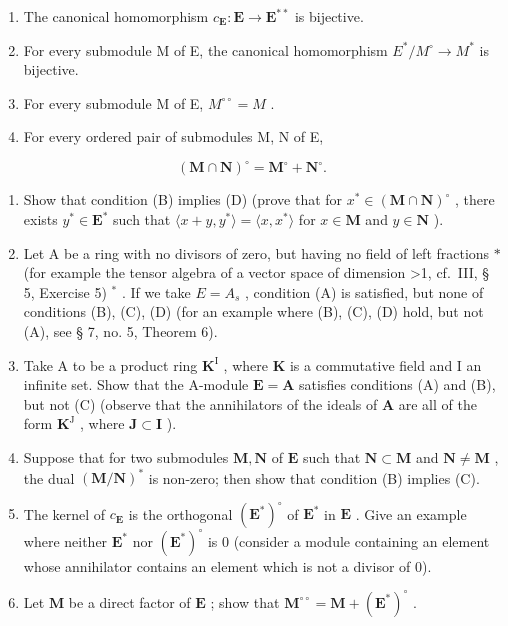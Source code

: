 \begin{enumerate}
\def\labelenumi{(\Alph{enumi})}
\item
  The canonical homomorphism \(c_{\mathbf{E}}: \mathbf{E} \to \mathbf{E}^{**}\) is bijective.
\item
  For every submodule M of E, the canonical homomorphism \(E^{*}/M^{\circ} \rightarrow M^{*}\) is bijective.
\item
  For every submodule M of E, \(M^{\circ\circ} = M\) .
\item
  For every ordered pair of submodules M, N of E,
\end{enumerate}

\[
(\mathbf {M} \cap \mathbf {N}) ^ {\circ} = \mathbf {M} ^ {\circ} + \mathbf {N} ^ {\circ}.
\]

\begin{enumerate}
\def\labelenumi{(\alph{enumi})}
\item
  Show that condition (B) implies (D) (prove that for \(x^{*} \in (\mathbf{M} \cap \mathbf{N})^{\circ}\) , there exists \(y^{*} \in \mathbf{E}^{*}\) such that \(\langle x + y, y^{*} \rangle = \langle x, x^{*} \rangle\) for \(x \in \mathbf{M}\) and \(y \in \mathbf{N}\) ).
\item
  Let A be a ring with no divisors of zero, but having no field of left fractions \(*\) (for example the tensor algebra of a vector space of dimension \textgreater1, cf.~III, § 5, Exercise 5) \(^{*}\) . If we take \(E = A_{s}\) , condition (A) is satisfied, but none of conditions (B), (C), (D) (for an example where (B), (C), (D) hold, but not (A), see § 7, no. 5, Theorem 6).
\item
  Take A to be a product ring \(\mathbf{K}^{\mathrm{I}}\) , where \(\mathbf{K}\) is a commutative field and I an infinite set. Show that the A-module \(\mathbf{E} = \mathbf{A}\) satisfies conditions (A) and (B), but not (C) (observe that the annihilators of the ideals of \(\mathbf{A}\) are all of the form \(\mathbf{K}^{\mathrm{J}}\) , where \(\mathbf{J} \subset \mathbf{I}\) ).
\item
  Suppose that for two submodules \(\mathbf{M},\mathbf{N}\) of \(\mathbf{E}\) such that \(\mathbf{N} \subset \mathbf{M}\) and \(\mathbf{N} \neq \mathbf{M}\) , the dual \((\mathbf{M} / \mathbf{N})^*\) is non-zero; then show that condition (B) implies (C).
\item
  The kernel of \(c_{\mathbf{E}}\) is the orthogonal \((\mathbf{E}^{*})^{\circ}\) of \(\mathbf{E}^{*}\) in \(\mathbf{E}\) . Give an example where neither \(\mathbf{E}^{*}\) nor \((\mathbf{E}^{*})^{\circ}\) is 0 (consider a module containing an element whose annihilator contains an element which is not a divisor of 0).
\item
  Let \(\mathbf{M}\) be a direct factor of \(\mathbf{E}\) ; show that \(\mathbf{M}^{\circ \circ} = \mathbf{M} + (\mathbf{E}^{*})^{\circ}\) .
\end{enumerate}


